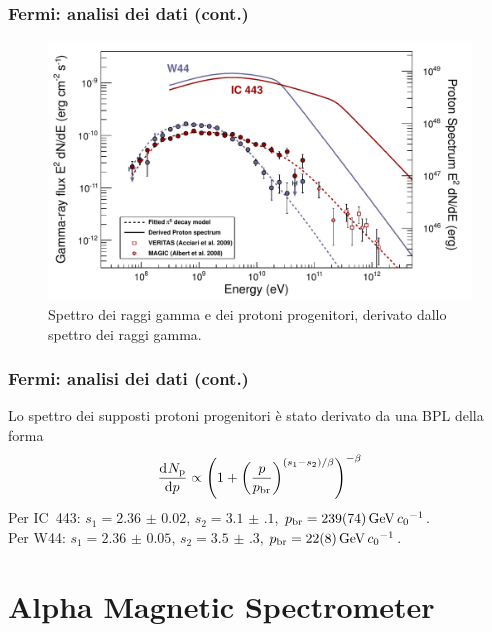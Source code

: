 \documentclass[10pt]{beamer}
\newcommand*{\dd}{\mathop{}\!\textup{d}} %
\newcommand*{\toder}[3][]{\frac{{\dd^{#1}}#2}{\dd {#3}^{#1}}}
\begin{document}
\begin{frame}
  \frametitle{Fermi: analisi dei dati (cont.)}
  \begin{figure}
    \centering
    \includegraphics[width=.8\columnwidth]{1231160fig3}
    \caption{Spettro dei raggi gamma e dei protoni progenitori, derivato dallo
      spettro dei raggi gamma.}
  \end{figure}
\end{frame}

\begin{frame}
  \frametitle{Fermi: analisi dei dati (cont.)}
  Lo spettro dei supposti protoni progenitori è stato derivato da una BPL della
  forma
  \begin{equation*}
    \toder{N_{\textup{p}}}{p} \propto
    \left(
      1 +
      \left(
        \frac{p}{p_{\textup{br}}}
      \right)^{(s_{1} - s_{2})/\beta}
    \right)^{-\beta}
  \end{equation*}
  Per IC~443: $s_{1} = \num{2.36(2)}$, $s_{2} = \num{3.1(1)}$,
  $p_{\textup{br}} = \SI{239(74)}{\giga \electronvolt \per \clight}$.  \\
  Per W44: $s_{1} = \num{2.36(5)}$, $s_{2} = \num{3.5(3)}$,
  $p_{\textup{br}} = \SI{22(8)}{\giga \electronvolt \per \clight}$.
\end{frame}

\section[AMS]{Alpha Magnetic Spectrometer}
\end{document}
